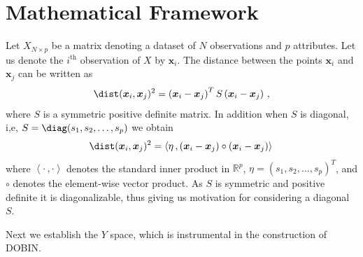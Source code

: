 \documentclass[a4paper,11pt]{article}
\begin{document}
\section{Mathematical Framework}\label{sec:MathFrame}
Let $X_{N \times p}$ be a matrix denoting a dataset of $N$ observations and $p$ attributes. Let us denote the  $i^{\text{th}}$ observation of $X$ by $\bm{x}_i$. The  distance between the points $\bm{x}_i$ and $\bm{x}_j$  can be written as
\begin{equation}\label{eq:secMF1}
\dist(\bm{x}_i, \bm{x}_j)^2 = \left( \bm{x}_i - \bm{x}_j \right)^T S \left( \bm{x}_i - \bm{x}_j \right) \, ,
\end{equation}
where $S$ is a symmetric positive definite matrix.  In addition when $S$ is diagonal, i,e, $S = \diag(s_1, s_2, \ldots, s_p)$ we obtain
\begin{equation}\label{eq:secMF2}
    \dist(\bm{x}_i, \bm{x}_j)^2 = \left\langle \eta\, ,  \left( \bm{x}_i - \bm{x}_j \right)\circ \left( \bm{x}_i - \bm{x}_j \right)  \right\rangle\,
\end{equation}
where $\left\langle \cdot\, , \cdot \right\rangle$ denotes the standard inner product in $\mathbb{R}^p$,   $\eta = \left(s_1, s_2, \ldots, s_p\right)^T$, and $\circ$ denotes the element-wise  vector product. As $S$ is symmetric and positive definite  it is diagonalizable, thus giving us motivation for considering a diagonal $S$.

Next we establish the $Y$ space, which is instrumental in the construction of DOBIN.
\end{document}
